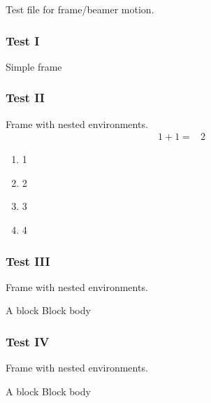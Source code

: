 \documentclass[]{beamer}
\begin{document}
Test file for frame/beamer motion.

\begin{frame}                         %
  \frametitle{Test I}
  Simple frame                        %
\end{frame}

\begin{frame}                         %
  \frametitle{Test II}
  Frame with nested environments.
  \begin{equation}
    \begin{aligned}
      1 + 1 = & 2
    \end{aligned}
  \end{equation}
\end{frame}                           %

\begin{enumerate}
  \item 1
  \item 2
  \item 3
  \item 4
\end{enumerate}
\begin{frame}                         %
  \frametitle{Test III}
  Frame with nested environments.
  \begin{block}{A block}
    Block body
  \end{block}
\end{frame}                           %

\begin{frame}                         %
  \frametitle{Test IV}
  Frame with nested environments.
  \begin{exampleblock}{A block}
    Block body
  \end{exampleblock}
\end{frame}                          %
\end{document}
